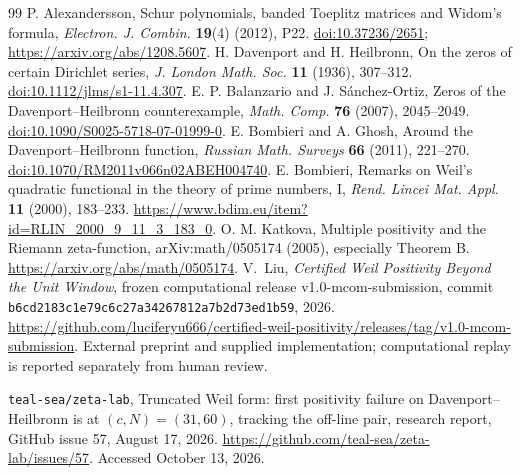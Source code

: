 \documentclass[11pt]{article}
\theoremstyle{remark}
\newcommand{\code}[1]{\nolinkurl{#1}}
\begin{document}
\begin{thebibliography}{99}
P. Alexandersson, Schur polynomials, banded Toeplitz matrices and Widom's
formula, \emph{Electron. J. Combin.} \textbf{19}(4) (2012), P22.
\href{https://doi.org/10.37236/2651}{doi:10.37236/2651};
\url{https://arxiv.org/abs/1208.5607}.
H. Davenport and H. Heilbronn,
On the zeros of certain Dirichlet series,
\emph{J. London Math. Soc.} \textbf{11} (1936), 307--312.
\href{https://doi.org/10.1112/jlms/s1-11.4.307}{doi:10.1112/jlms/s1-11.4.307}.
E. P. Balanzario and J. S\'anchez-Ortiz,
Zeros of the Davenport--Heilbronn counterexample,
\emph{Math. Comp.} \textbf{76} (2007), 2045--2049.
\href{https://doi.org/10.1090/S0025-5718-07-01999-0}{doi:10.1090/S0025-5718-07-01999-0}.
E. Bombieri and A. Ghosh,
Around the Davenport--Heilbronn function,
\emph{Russian Math. Surveys} \textbf{66} (2011), 221--270.
\href{https://doi.org/10.1070/RM2011v066n02ABEH004740}{doi:10.1070/RM2011v066n02ABEH004740}.
E. Bombieri,
Remarks on Weil's quadratic functional in the theory of prime numbers, I,
\emph{Rend. Lincei Mat. Appl.} \textbf{11} (2000), 183--233.
\url{https://www.bdim.eu/item?id=RLIN_2000_9_11_3_183_0}.
O. M. Katkova,
Multiple positivity and the Riemann zeta-function,
arXiv:math/0505174 (2005), especially Theorem B.
\url{https://arxiv.org/abs/math/0505174}.
V.~Liu, \emph{Certified Weil Positivity Beyond the Unit Window}, frozen
computational release v1.0-mcom-submission, commit
\code{b6cd2183c1e79c6c27a34267812a7b2d73ed1b59}, 2026.
\url{https://github.com/luciferyu666/certified-weil-positivity/releases/tag/v1.0-mcom-submission}.
External preprint and supplied implementation; computational replay is
reported separately from human review.

\texttt{teal-sea/zeta-lab},
Truncated Weil form: first positivity failure on Davenport--Heilbronn is at
\((c,N)=(31,60)\), tracking the off-line pair,
research report, GitHub issue 57, August 17, 2026.
\url{https://github.com/teal-sea/zeta-lab/issues/57}.
Accessed October 13, 2026.
\end{thebibliography}
\end{document}
